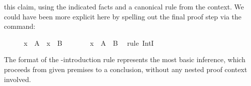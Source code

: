 \begin{isabellebody}
\begin{isamarkuptext}
  this claim, using the indicated facts and a canonical rule from the
  context.  We could have been more explicit here by spelling out the
  final proof step via the \hyperlink{command.by}{\mbox{}} command:%
\end{isamarkuptext}%
\isamarkuptrue%
%
\isadelimproof
\ \ \ \ %
\endisadelimproof
%
\isatagproof
{}\isamarkupfalse%
\ {}x\ {}\ A{}\ \ {}x\ {}\ B{}\isanewline
\ \ \ \ \isamarkupfalse%
\ \isamarkupfalse%
\ {}x\ {}\ A\ {}\ B{}\ \isamarkupfalse%
\ {}rule\ IntI{}%
\endisatagproof
{\isafoldproof}%
%
\isadelimproof
%
\endisadelimproof
%
\begin{isamarkuptext}%
\noindent The format of the -introduction rule represents
  the most basic inference, which proceeds from given premises to a
  conclusion, without any nested proof context involved.


\end{isamarkuptext}
\end{isabellebody}
